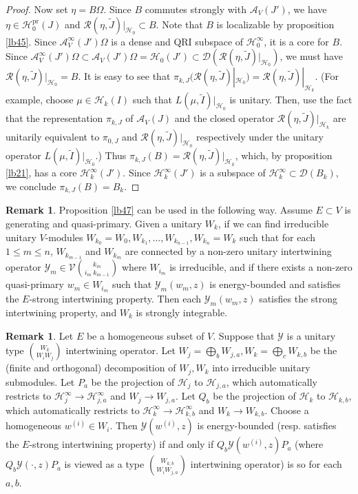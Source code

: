 \documentclass[11pt,b5paper,notitlepage]{article}
\theoremstyle{definition}
\newtheorem{rem}[df]{Remark}
\theoremstyle{plain}
\newcommand{\mc}{\mathcal}
\newcommand{\wtd}{\widetilde}
\newcommand{\Dom}{\scr D}
\newcommand{\scr}{\mathscr}
\newcommand{\pr}{\mathrm{pr}}
\numberwithin{equation}{subsection}
\begin{document}
\begin{proof}
Now set $\eta=B\Omega$. Since $B$ commutes strongly with $\mc A_V(J')$, we have $\eta\in\mc H_0^\pr(J)$ and $\scr R(\eta,\wtd J)|_{\mc H_0}\subset B$. Note that $B$ is localizable by proposition \ref{lb45}. Since $\mc A_V^\infty(J')\Omega$ is a dense and QRI subspace of $\mc H_0^\infty$, it is a core for $B$. Since $\mc A_V^\infty(J')\Omega\subset \mc A_V(J')\Omega=\mc H_0(J')\subset\Dom(\scr R(\eta,\wtd J)|_{\mc H_0})$,  we must have $\scr R(\eta,\wtd J)|_{\mc H_0}=B$. It is easy to see that $\pi_{k,J}(\scr R(\eta,\wtd J)|_{\mc H_0})=\scr R(\eta,\wtd J)|_{\mc H_k}$. (For example,  choose $\mu\in\mc H_k(I)$ such that $L(\mu,\wtd I)|_{\mc H_0}$ is unitary. Then, use the fact that the representation $\pi_{k,J}$ of $\mc A_V(J)$ and the closed operator $\scr R(\eta,\wtd J)|_{\mc H_k}$ are unitarily equivalent  to $\pi_{0,J}$ and $\scr R(\eta,\wtd J)|_{\mc H_0}$ respectively under the unitary operator $L(\mu,\wtd I)|_{\mc H_0}$.) Thus $\pi_{k,J}(B)=\scr R(\eta,\wtd J)|_{\mc H_k}$, which, by proposition \ref{lb21}, has a core $\mc H_k^\infty(J')$. Since  $\mc H_k^\infty(J')$ is a subspace of $\mc H_k^\infty\subset\Dom(B_k)$, we conclude $\pi_{k,J}(B)=B_k$.
\end{proof}



\begin{rem}\label{lb50}
Proposition \ref{lb47} can be used in the following way. Assume $E\subset V$ is generating and quasi-primary. Given a unitary $W_k$, if we can find irreducible unitary $V$-modules $W_{k_0}=W_0,W_{k_1},\dots,W_{k_{n-1}},W_{k_n}=W_k$ such that for each $1\leq m\leq n$, $W_{k_{m-1}}$ and $W_{k_m}$ are connected by a non-zero unitary intertwining operator $\mc Y_m\in\mc V{k_m\choose {i_m}~k_{m-1}}$ where $W_{i_m}$ is irreducible, and if there exists a non-zero quasi-primary $w_m\in W_{i_m}$ such that $\mc Y_m(w_m,z)$ is energy-bounded and satisfies the $E$-strong intertwining property. Then each  $\mc Y_m(w_m,z)$ satisfies the strong intertwining property, and $W_k$ is strongly integrable.
\end{rem}




\begin{rem}\label{lb99}
Let $E$ be a homogeneous subset of $V$. Suppose that $\mc Y$ is a unitary type $W_k\choose W_iW_j$ intertwining operator. Let $W_j=\bigoplus_b W_{j,a},W_k=\bigoplus_c W_{k,b}$ be the (finite and orthogonal) decomposition of $W_j,W_k$ into irreducible unitary submodules. Let $P_a$ be the projection of $\mc H_j$ to $\mc H_{j,a}$, which automatically restricts to $\mc H_j^\infty\rightarrow\mc H_{j,a}^\infty$ and $W_j\rightarrow W_{j,a}$. Let $Q_b$ be the projection of $\mc H_k$ to $\mc H_{k,b}$, which automatically restricts to $\mc H_k^\infty\rightarrow\mc H_{k,b}^\infty$ and $W_k\rightarrow W_{k,b}$. Choose a homogeneous $w^{(i)}\in W_i$. Then $\mc Y(w^{(i)},z)$ is energy-bounded (resp. satisfies the $E$-strong intertwining property) if and only if $Q_b\mc Y(w^{(i)},z) P_a$ (where $Q_b\mc Y(\cdot,z) P_a$ is viewed as a type $W_{k,b}\choose W_iW_{j,a}$ intertwining operator) is so for each $a,b$.
\end{rem}
\end{document}
